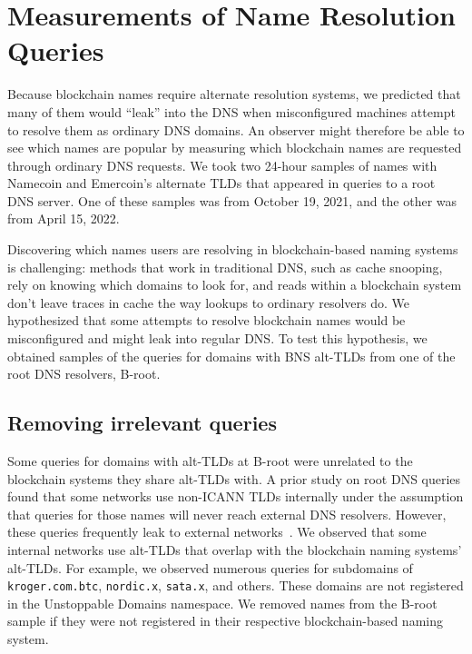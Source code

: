 \section{Measurements of Name Resolution Queries}
\label{sec:b-root}

Because blockchain names require alternate resolution systems, we predicted 
that many of them would ``leak'' into the DNS when misconfigured machines 
attempt to resolve them as ordinary DNS domains. An observer might therefore be 
able to see which names are popular by measuring which blockchain names are 
requested through ordinary DNS requests. We took two 24-hour samples of names 
with Namecoin and Emercoin's alternate TLDs that appeared in 
queries to a root DNS server. One of these samples was from October 19, 2021, 
and the other was from April 15, 2022.

Discovering which names users are resolving in blockchain-based 
naming systems is challenging: methods that work in traditional DNS, such as 
cache snooping, rely on knowing which domains to look for, and reads within a 
blockchain system don't leave traces in cache the way lookups to ordinary 
resolvers do. We hypothesized that some attempts to resolve blockchain names 
would be misconfigured and might leak into regular DNS. To test this 
hypothesis, we obtained samples of the queries for domains with BNS alt-TLDs 
from one of the root DNS resolvers, B-root.

\subsection{Removing irrelevant queries}

Some queries for domains with alt-TLDs at B-root were unrelated to the 
blockchain systems they share alt-TLDs with. A prior study on root DNS queries 
found that some networks use non-ICANN TLDs internally under the assumption 
that queries for those names will never reach external DNS resolvers. However, 
these queries frequently leak to external networks~\cite{chen_wpad_2016}. We 
observed that some 
internal networks use alt-TLDs that overlap with the blockchain naming systems' 
alt-TLDs. For example, we observed numerous queries for subdomains of 
\texttt{kroger.com.btc}, \texttt{nordic.x}, \texttt{sata.x}, and others. These 
domains are not registered in the Unstoppable Domains namespace. We removed 
names from the B-root sample if they were not registered in their respective 
blockchain-based naming system.

